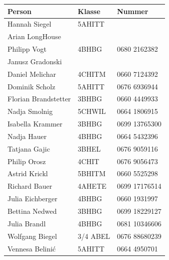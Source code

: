 \documentclass[12pt]{article}
\begin{document}
 \begin{tabular}{ | p{} | p{} |  p{} |}
    \hline
\textbf{Person} & \textbf{Klasse} & \textbf{Nummer}  \\ 
    \hline 
    \hline
   
Hannah Siegel & 5AHITT & \\ \hline
Arian LongHouse &  & \\ \hline
Philipp Vogt & 4BHBG & 0680 2162382 \\ \hline
Janusz Gradonski&  & \\ \hline
Daniel Melichar& 4CHITM & 0660 7124392 \\ \hline
Dominik Scholz & 5AHITT & 0676 6936944 \\ \hline
Florian Brandstetter &  3BHBG & 0660 4449933 \\ \hline
Nadja Smolnig & 5CHWIL & 0664 1806915 \\ \hline
Isabella Krammer & 3BHBG & 0699 13765300 \\ \hline
Nadja Hauer &  4BHBG & 0664 5432396 \\ \hline
Tatjana Gajic & 3BHEL & 0676 9059116 \\ \hline
Philip Orosz & 4CHIT & 0676 9056473\\ \hline
Astrid Krickl & 5BHITM & 0660 5525298 \\ \hline
Richard Bauer & 4AHETE & 0699 17176514 \\ \hline
Julia Eichberger & 4BHBG &  0660 1931997\\ \hline
Bettina Nedwed & 3BHBG & 0699 18229127 \\ \hline
Julia Brandl & 4BHBG & 0681 10346606\\ \hline
Wolfgang Biegel  & 3/4 ABEL & 0676 88680239\\ \hline
Vennesa Belinić & 5AHITT & 0664 4950701 \\ \hline
  \end{tabular}
\FloatBarrier
\newpage
\end{document}
